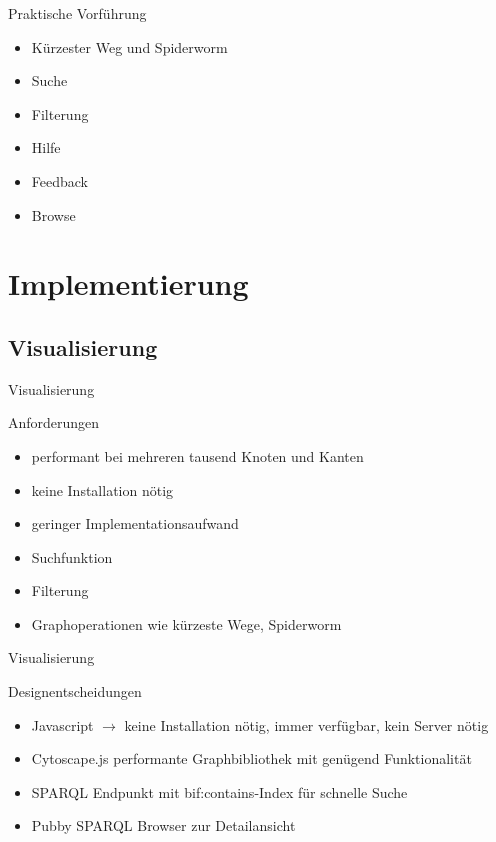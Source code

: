 \documentclass[14pt,aspectratio=1610]{beamer}
\begin{document}
\begin{frame}{Praktische Vorführung}
\begin{itemize}
\item Kürzester Weg und Spiderworm
\item Suche
\item Filterung
\item Hilfe
\item Feedback
\item Browse
\end{itemize}
\end{frame}

\section{Implementierung}%

\subsection{Visualisierung}%

\begin{frame}{Visualisierung}
\begin{block}{Anforderungen}
\begin{itemize}
\item performant bei mehreren tausend Knoten und Kanten 
\item keine Installation nötig
\item geringer Implementationsaufwand
\item Suchfunktion
\item Filterung
\item Graphoperationen wie kürzeste Wege, Spiderworm
\end{itemize}
\end{block}
\end{frame}

\begin{frame}{Visualisierung}
\begin{block}{Designentscheidungen}
\begin{itemize}
\item Javascript $\rightarrow$ keine Installation nötig, immer verfügbar, kein Server nötig
\item Cytoscape.js performante Graphbibliothek mit genügend Funktionalität
\item SPARQL Endpunkt mit bif:contains-Index für schnelle Suche
\item Pubby SPARQL Browser zur Detailansicht 
\end{itemize}
\end{block}
\end{frame}
\end{document}
